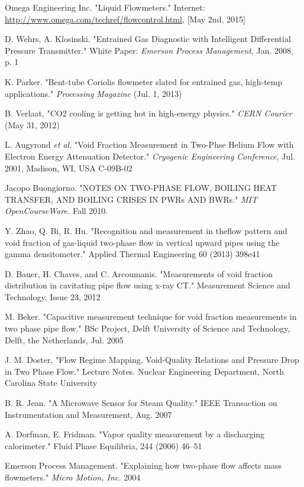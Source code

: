 \documentclass{report}
\begin{document}
\begin{thebibliography}{9}
Omega Engineering Inc. "Liquid Flowmeters." Internet: \underline{http://www.omega.com/techref/flowcontrol.html}, [May 2nd, 2015]

D. Wehrs, A. Klosinski. "Entrained Gas Diagnostic with Intelligent Differential Pressure Transmitter." White Paper: \textit{Emerson Process Management}, Jan. 2008, p. 1

K. Parker. "Bent-tube Coriolis flowmeter slated for entrained gas, high-temp applications." \textit{Processing Magazine} (Jul. 1, 2013)

B. Verlaat, "CO2 cooling is getting hot in high-energy physics." \textit{CERN Courier} (May 31, 2012)

L. Augyrond \textit{et al.} "Void Fraction Measurement in Two-Phse Helium Flow with Electron Energy Attenuation Detector." \textit{Cryogenic Engineering Conference}, Jul. 2001, Madison, WI, USA C-09B-02

Jacopo Buongiorno. "NOTES ON TWO‐PHASE FLOW, BOILING HEAT TRANSFER, AND BOILING CRISES
IN PWRs AND BWRs." \textit{MIT OpenCourseWare.} Fall 2010.

Y. Zhao, Q. Bi, R. Hu. "Recognition and measurement in theflow pattern and void fraction of gas-liquid two-phase flow in vertical upward pipes using the gamma densitometer." Applied Thermal Engineering 60 (2013) 398e41

D. Bauer, H. Chaves, and C. Arcoumanis. "Measurements of void fraction distribution in cavitating pipe flow
using x-ray CT." Measurement Science and Technology, Issue 23, 2012

M. Beker. "Capacitive measurement technique for void fraction measurements in two phase pipe flow." BSc Project, Delft University of Science and Technology, Delft, the Netherlands, Jul. 2005

J. M. Doster, "Flow Regime Mapping, Void-Quality Relations and Pressure Drop in Two Phase Flow." Lecture Notes. Nuclear Engineering Department, North Carolina State University 

B. R. Jean. "A Microwave Sensor for Steam Quality." IEEE Transaction on Instrumentation and Measurement, Aug. 2007

A. Dorfman, E. Fridman. "Vapor quality measurement by a discharging calorimeter." Fluid Phase Equilibria, 244 (2006) 46–51

Emerson Process Management. "Explaining how two-phase flow affects mass flowmeters." \textit{Micro Motion, Inc.} 2004

\end{thebibliography}
\appendix
{} 
\singlespacing
\end{document}
